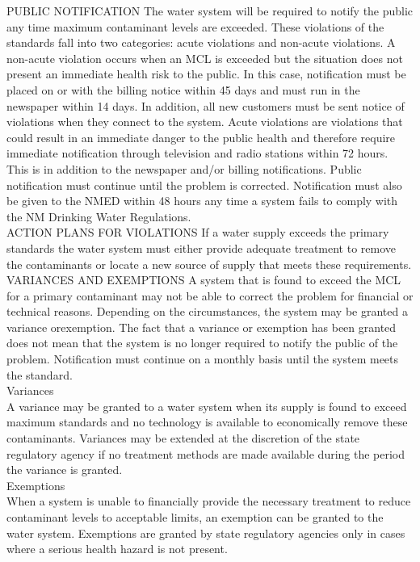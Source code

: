 \documentclass{article}
\begin{document}
PUBLIC NOTIFICATION The water system will be required to notify the public any time maximum contaminant levels are exceeded. These violations of the standards fall into two categories: acute violations and non-acute violations. A non-acute violation occurs when an MCL is exceeded but the situation does not present an immediate health risk to the public. In this case, notification must be placed on or with the billing notice within 45 days and must run in the newspaper within 14 days. In addition, all new customers must be sent notice of violations when they connect to the system. Acute violations are violations that could result in an immediate danger to the public health and therefore require immediate notification through television and radio stations within 72 hours. This is in addition to the newspaper and/or billing notifications. Public notification must continue until the problem is corrected. Notification must also be given to the NMED within 48 hours any time a system fails to comply with the NM Drinking Water Regulations.  \\
ACTION PLANS FOR VIOLATIONS If a water supply exceeds the primary standards the water system must either provide adequate treatment to remove the contaminants or locate a new source of supply that meets these requirements.  \\
VARIANCES AND EXEMPTIONS A system that is found to exceed the MCL for a primary contaminant may not be able to correct the problem for financial or technical reasons. Depending on the circumstances, the system may be granted a variance orexemption. The fact that a variance or exemption has been granted does not mean that the system is no longer required to notify the public of the problem. Notification must continue on a monthly basis until the system meets the standard. \\
Variances \\
A variance may be granted to a water system when its supply is found to exceed maximum standards and no technology is available to economically remove these contaminants. Variances may be extended at the discretion of the state regulatory agency if no treatment methods are made available during the period the variance is granted. \\
Exemptions \\
When a system is unable to financially provide the necessary treatment to reduce contaminant levels to acceptable limits, an exemption can be granted to the water system. Exemptions are granted by state regulatory agencies only in cases where a serious health hazard is not present. \\
\end{document}
